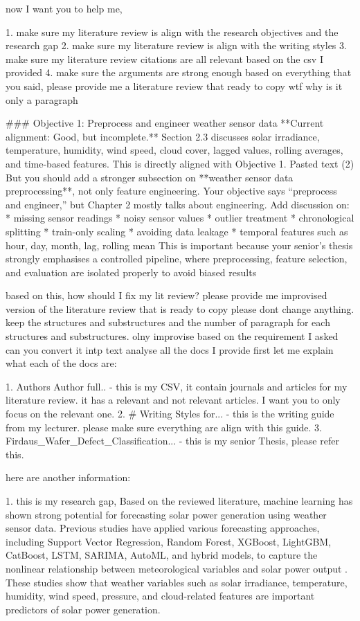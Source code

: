 now I want you to help me,

1. make sure my literature review is align with the research objectives and the research gap
2. make sure my literature review is align with the writing styles
3. make sure my literature review citations are all relevant based on the csv I provided
4. make sure the arguments are strong enough
based on everything that you said, please provide me a literature review that ready to copy
wtf why is it only a paragraph

### Objective 1: Preprocess and engineer weather sensor data **Current alignment: Good, but incomplete.** Section 2.3 discusses solar irradiance, temperature, humidity, wind speed, cloud cover, lagged values, rolling averages, and time-based features. This is directly aligned with Objective 1. Pasted text (2) But you should add a stronger subsection on **weather sensor data preprocessing**, not only feature engineering. Your objective says “preprocess and engineer,” but Chapter 2 mostly talks about engineering. Add discussion on: * missing sensor readings * noisy sensor values * outlier treatment * chronological splitting * train-only scaling * avoiding data leakage * temporal features such as hour, day, month, lag, rolling mean This is important because your senior’s thesis strongly emphasises a controlled pipeline, where preprocessing, feature selection, and evaluation are isolated properly to avoid biased results

based on this, how should I fix my lit review?
please provide me improvised version of the literature review that is ready to copy
please dont change anything. keep the structures and substructures and the number of paragraph for each structures and substructures. olny improvise based on the requirement I asked
can you convert it intp text
analyse all the docs I provide first let me explain what each of the docs are: 

 
1. Authors Author full.. - this is my CSV, it contain journals and articles for my literature review. it has a relevant and not relevant articles. I want you to only focus on the relevant one. 
2. # Writing Styles for... - this is the writing guide from my lecturer. please make sure everything are align with this guide.
3. Firdaus_Wafer_Defect_Classification... - this is my senior Thesis, please refer this.

here are another information:

1. this is my research gap,
Based on the reviewed literature, machine learning has shown strong potential for forecasting solar power generation using weather sensor data. Previous studies have applied various forecasting approaches, including Support Vector Regression, Random Forest, XGBoost, LightGBM, CatBoost, LSTM, SARIMA, AutoML, and hybrid models, to capture the nonlinear relationship between meteorological variables and solar power output \parencite{JnanaVarshitha2025, Bakht2025, Eren2025, ArellanosTafur2025, Alhassan2025}. These studies show that weather variables such as solar irradiance, temperature, humidity, wind speed, pressure, and cloud-related features are important predictors of solar power generation.

